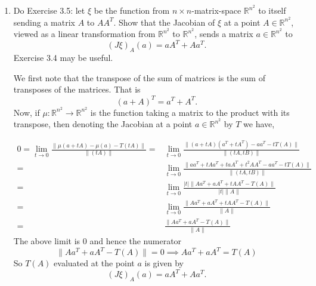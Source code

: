 \documentclass[12pt]{article}
\newcommand{\rl}{\mathbb{R}}
\begin{document}
\begin{enumerate}
\item Do Exercise 3.5: let $\xi$ be the function
    from $n \times n$-matrix-space $\rl^{n^2}$ to
    itself sending a matrix $A$ to $AA^T$. Show that
    the Jacobian of $\xi$ at a point
    $A \in \rl^{n^2}$, viewed as a linear
    transformation from $\rl^{n^2}$ to $\rl^{n^2}$,
    sends a matrix $a \in \rl^{n^2}$ to
    \[(J\xi)_A(a) = a A^T + A a^T.\]
Exercise 3.4 may be useful.
 
\begin{mybox}

    We first note that the transpose of the
    sum of matrices is the sum of transposes of
    the matrices. That is
    $$(a+A)^T=a^T+A^T.$$
    Now, if $\mu:\rl^{n^2}\to\rl^{n^2}$ is the function
    taking a matrix to the product with
    its transpose, then
    denoting the Jacobian at a point $a\in \rl^{n^2}$
    by $T$ we have,

    \begin{align*}
        0=\lim_{t\to 0}
        {\frac{\|\mu(a+tA)-\mu(a)-T(tA)\|}
        {\|(tA)\|}}
        =&\lim_{t\to 0}
        {\frac{\|(a+tA)(a^T+tA^T)-aa^T
        -tT(A)\|}
        {\|(tA,tB)\|}}\\
        =&\lim_{t\to 0}
        {\frac{\|aa^T+tAa^T+taA^T+t^2AA^T-aa^T
        -tT(A)\|}
        {\|(tA,tB)\|}}\\
        =&\lim_{t\to 0}
        {\frac{|t|\|Aa^T+aA^T+tAA^T-T(A)\|}
        {|t|\|A\|}}\\
        =&\lim_{t\to 0}
        {\frac{\|Aa^T+aA^T+tAA^T-T(A)\|}
        {\|A\|}}\\
        =&\frac{\|Aa^T+aA^T-T(A)\|}
        {\|A\|}
    \end{align*}
    The above limit is 0 and hence the numerator
    \[\|Aa^T+aA^T-T(A)\|=0\implies
    Aa^T+aA^T=T(A)\]
    So $T(A)$ evaluated at the point $a$ is
    given by
    \[(J\xi)_A(a) = a A^T + A a^T.\]
\end{mybox}

\end{enumerate}
\end{document}
